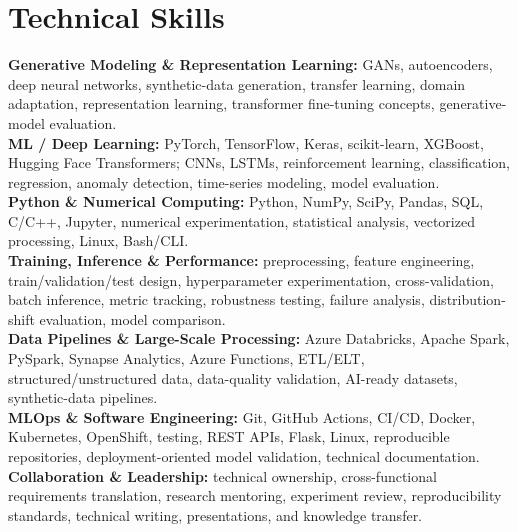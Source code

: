 \documentclass[10pt,letterpaper]{extarticle}
\begin{document}
\section{Technical Skills}
\textbf{Generative Modeling \& Representation Learning:} GANs, autoencoders, deep neural networks, synthetic-data generation, transfer learning, domain adaptation, representation learning, transformer fine-tuning concepts, generative-model evaluation.\\
\textbf{ML / Deep Learning:} PyTorch, TensorFlow, Keras, scikit-learn, XGBoost, Hugging Face Transformers; CNNs, LSTMs, reinforcement learning, classification, regression, anomaly detection, time-series modeling, model evaluation.\\
\textbf{Python \& Numerical Computing:} Python, NumPy, SciPy, Pandas, SQL, C/C++, Jupyter, numerical experimentation, statistical analysis, vectorized processing, Linux, Bash/CLI.\\
\textbf{Training, Inference \& Performance:} preprocessing, feature engineering, train/validation/test design, hyperparameter experimentation, cross-validation, batch inference, metric tracking, robustness testing, failure analysis, distribution-shift evaluation, model comparison.\\
\textbf{Data Pipelines \& Large-Scale Processing:} Azure Databricks, Apache Spark, PySpark, Synapse Analytics, Azure Functions, ETL/ELT, structured/unstructured data, data-quality validation, AI-ready datasets, synthetic-data pipelines.\\
\textbf{MLOps \& Software Engineering:} Git, GitHub Actions, CI/CD, Docker, Kubernetes, OpenShift, testing, REST APIs, Flask, Linux, reproducible repositories, deployment-oriented model validation, technical documentation.\\
\textbf{Collaboration \& Leadership:} technical ownership, cross-functional requirements translation, research mentoring, experiment review, reproducibility standards, technical writing, presentations, and knowledge transfer.
\end{document}
